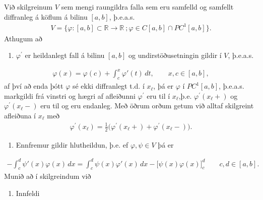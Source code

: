 \documentclass[a4paper,10pt,icelandic]{sphinxmanual}
\begin{document}
Við skilgreinum \(V\) sem mengi raungildra falla sem eru samfelld og samfellt diffranleg á köflum á bilinu  \([a,b]\), þ.e.a.s.
\begin{equation*}
\begin{split}V=\{ \varphi: [a,b]\subset{\mathbb  R}\to {{\mathbb  R}}~; \varphi \in C[a,b]\cap PC^1[a,b] \}.\end{split}
\end{equation*}
Athugum að
\begin{enumerate}
\def\theenumi{\arabic{enumi}}
\def\labelenumi{\theenumi .}
\makeatletter\def\p@enumii{\p@enumi \theenumi .}\makeatother
\item {} 
\(\varphi^\prime\) er heildanlegt fall á bilinu \([a,b]\) og undirstöðusetningin gildir í \(V\), þ.e.a.s.

\end{enumerate}
\begin{equation*}
\begin{split}\varphi(x)=\varphi(c)+\int_c^x\varphi'(t)\, dt, \qquad
x,c\in [a,b],\end{split}
\end{equation*}
af því að enda þótt \(\varphi\) sé ekki diffranlegt t.d. í \(x_\ell\), þá er \(\varphi\) í \(PC^1[a,b]\), þ.e.a.s. markgildi frá vinstri og hægri af afleiðunni \(\varphi^\prime\) eru til í \(x_\ell\),þ.e. \(\varphi^\prime(x_\ell+)\) og  \(\varphi^\prime(x_\ell-)\) eru til og eru endanleg. Með öðrum orðum getum við alltaf skilgreint afleiðuna í \(x_\ell\) með
\begin{equation*}
\begin{split}\varphi^\prime(x_\ell)=\tfrac 12\big(\varphi^\prime(x_\ell+)+\varphi^\prime(x_\ell-)\big).\end{split}
\end{equation*}\begin{enumerate}
\def\theenumi{\arabic{enumi}}
\def\labelenumi{\theenumi .}
\makeatletter\def\p@enumii{\p@enumi \theenumi .}\makeatother
\setcounter{enumi}{1}
\item {} 
Ennfremur gildir hlutheildun, þ.e. ef \(\varphi, \psi \in V\) þá er

\end{enumerate}
\begin{equation*}
\begin{split}-\int_c^d\psi'(x)\varphi(x)\, dx
=\int_c^d\psi(x)\varphi'(x) \, dx
-\big[\psi(x)\varphi(x)\big]_c^d
\qquad c,d\in [a,b].\end{split}
\end{equation*}
Munið að í  skilgreindum við
\begin{enumerate}
\def\theenumi{\Roman{enumi}}
\def\labelenumi{\theenumi .}
\makeatletter\def\p@enumii{\p@enumi \theenumi .}\makeatother
\item {} 
Innfeldi

\end{enumerate}
\end{document}
